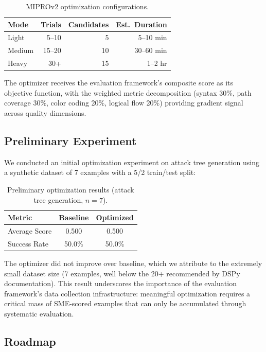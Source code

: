 \begin{table}[t]
\centering
\caption{MIPROv2 optimization configurations.}
\label{tab:mipro}
\begin{tabular}{@{}lrrr@{}}
\toprule
\textbf{Mode} & \textbf{Trials} & \textbf{Candidates} & \textbf{Est.\ Duration} \\
\midrule
Light & 5--10 & 5 & 5--10 min \\
Medium & 15--20 & 10 & 30--60 min \\
Heavy & 30+ & 15 & 1--2 hr \\
\bottomrule
\end{tabular}
\end{table}

The optimizer receives the evaluation framework's composite score as its objective function, with the weighted metric decomposition (syntax 30\%, path coverage 30\%, color coding 20\%, logical flow 20\%) providing gradient signal across quality dimensions.

\subsection{Preliminary Experiment}

We conducted an initial optimization experiment on attack tree generation using a synthetic dataset of 7 examples with a 5/2 train/test split:

\begin{table}[t]
\centering
\caption{Preliminary optimization results (attack tree generation, $n=7$).}
\label{tab:prelim}
\begin{tabular}{@{}lcc@{}}
\toprule
\textbf{Metric} & \textbf{Baseline} & \textbf{Optimized} \\
\midrule
Average Score & 0.500 & 0.500 \\
Success Rate & 50.0\% & 50.0\% \\
\bottomrule
\end{tabular}
\end{table}

The optimizer did not improve over baseline, which we attribute to the extremely small dataset size (7 examples, well below the 20+ recommended by DSPy documentation). This result underscores the importance of the evaluation framework's data collection infrastructure: meaningful optimization requires a critical mass of SME-scored examples that can only be accumulated through systematic evaluation.

\subsection{Roadmap}

